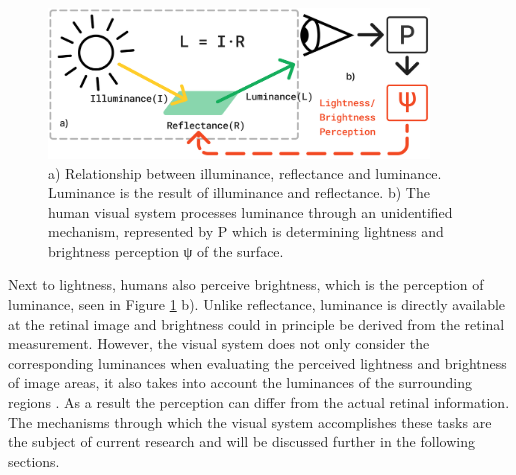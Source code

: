 \begin{figure}[H]
\centering
\centering
\includegraphics[width=0.9\textwidth]{media/lightness_color_formula.png}
\begin{minipage}{0.8\textwidth}
\caption[Relationship between illuminance, reflectance and luminance]{a) Relationship
between illuminance, reflectance and luminance. Luminance is the result of illuminance and
reflectance. b) The human visual system processes luminance through an unidentified
mechanism, represented by P which is determining lightness and brightness perception ψ of
the surface.}
\label{fig:light_visual_system}
\end{minipage}
\end{figure}

Next to lightness, humans also perceive brightness, which is the perception of luminance,
seen in Figure \ref*{fig:light_visual_system} b). Unlike reflectance, luminance is directly available
at the retinal image and brightness could in principle be derived from the retinal
measurement. However, the visual system does not only consider the corresponding
luminances when evaluating the perceived lightness and brightness of image areas, it also
takes into account the luminances of the surrounding regions \parencite{Kingdom1997}. As a
result the perception can differ from the actual retinal information. The mechanisms
through which the visual system accomplishes these tasks are the subject of current
research and will be discussed further in the following sections.
\newpage

